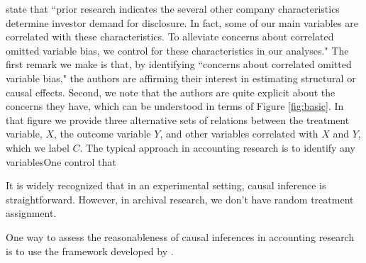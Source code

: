 \documentclass[11pt]{amsart}
\begin{document}
\cite{Hollander:2010jg} state that ``prior research indicates the several other company characteristics determine investor demand for disclosure. In fact, some of our main variables are correlated with these characteristics.
To alleviate concerns about correlated omitted variable bias, we control for these characteristics in our analyses."
The first remark we make is that, by identifying ``concerns about correlated omitted variable bias," the authors are affirming their interest in estimating structural or causal effects.
Second, we note that the authors are quite explicit about the concerns they have, which can be understood in terms of Figure \ref{fig:basic}.
In that figure we provide three alternative sets of relations between the treatment variable, $X$, the outcome variable $Y$, and other variables correlated with $X$ and $Y$, which we label $C$.
The typical approach in accounting research is to identify any variablesOne control that 

It is widely recognized that in an experimental setting, causal inference is straightforward.
However, in archival research, we don't have random treatment assignment.


One way to assess the reasonableness of causal inferences in accounting research is to use the framework developed by \citet{Pearl:2009kh}. 

%



\end{document}
